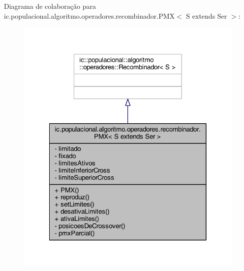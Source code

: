 Diagrama de colaboração para ic.\-populacional.\-algoritmo.\-operadores.\-recombinador.\-P\-M\-X$<$ S extends Ser $>$\-:\nopagebreak
\begin{figure}[H]
\begin{center}
\leavevmode
\includegraphics[width=318pt]{classic_1_1populacional_1_1algoritmo_1_1operadores_1_1recombinador_1_1_p_m_x_3_01_s_01extends_01_ser_01_4__coll__graph}
\end{center}
\end{figure}
